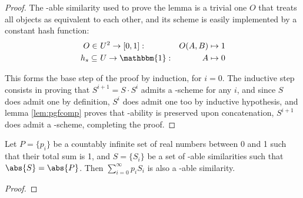 \begin{proof}
    The \lsh-able similarity used to prove the lemma is a trivial one $O$ that treats all objects as equivalent to each other, and its scheme is easily implemented by a constant hash function:
    \begin{align*}
        O         \in&\ U^2 \to [0, 1]    : & O(A, B) \mapsto 1 \\
        h_s \subseteq&\ U \to \mathbbm{1} : & A \mapsto 0
    \end{align*}

    This forms the base step of the proof by induction, for $i = 0$. The inductive step consists in proving that $S^{i + 1} = S \cdot S^i$ admits a \lsh-scheme for any $i$, and since $S$ does admit one by definition, $S^i$ does admit one too by inductive hypothesis, and lemma \ref{lem:pgfcomp} proves that \lsh-ability is preserved upon concatenation, $S^{i + 1}$ does admit a \lsh-scheme, completing the proof.
\end{proof}

\begin{lem}[L4]\label{l:pgf_4}
    Let $P = \{p_i\}$ be a countably infinite set of real numbers between 0 and 1 such that their total sum is 1, and $S = \{S_i\}$ be a set of \lsh-able similarities such that $\abs{S} = \abs{P}$. Then $\sum_{i = 0}^{\infty} p_i S_i$ is also a \lsh-able similarity.
\end{lem}

\begin{proof}

\end{proof}

